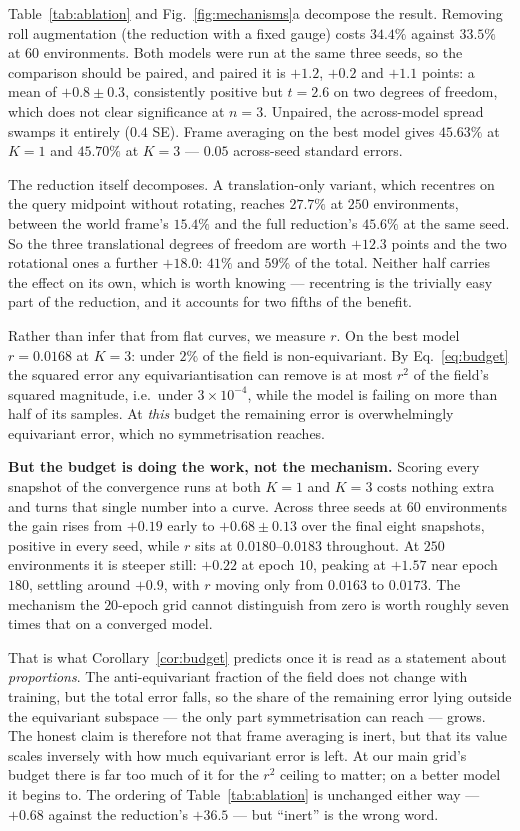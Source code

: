 \documentclass[10pt,twocolumn,letterpaper]{article}
\theoremstyle{plain}
\begin{document}
Table~\ref{tab:ablation} and Fig.~\ref{fig:mechanisms}a decompose the result.
Removing roll augmentation (the reduction with a fixed gauge) costs $34.4\%$
against $33.5\%$ at $60$ environments. Both models were run at the same three
seeds, so the comparison should be paired, and paired it is $+1.2$, $+0.2$ and
$+1.1$ points: a mean of $+0.8\pm0.3$, consistently positive but $t=2.6$ on two
degrees of freedom, which does not clear significance at $n{=}3$. Unpaired, the
across-model spread swamps it entirely ($0.4$ SE). Frame averaging on the best
model gives $45.63\%$ at $K{=}1$ and $45.70\%$ at $K{=}3$ --- $0.05$ across-seed
standard errors.

The reduction itself decomposes. A translation-only variant, which recentres on
the query midpoint without rotating, reaches $27.7\%$ at $250$ environments,
between the world frame's $15.4\%$ and the full reduction's $45.6\%$ at the same
seed. So the
three translational degrees of freedom are worth $+12.3$ points and the two
rotational ones a further $+18.0$: $41\%$ and $59\%$ of the total. Neither half
carries the effect on its own, which is worth knowing --- recentring is the
trivially easy part of the reduction, and it accounts for two fifths of the
benefit.

Rather than infer that from flat curves, we measure $r$. On the best model
$r=0.0168$ at $K{=}3$: under $2\%$ of the field is non-equivariant. By
Eq.~\eqref{eq:budget} the squared error any equivariantisation can remove is at
most $r^2$ of the field's squared magnitude, i.e.\ under $3\times10^{-4}$, while
the model is failing on more than half of its samples. At \emph{this} budget the
remaining error is overwhelmingly equivariant error, which no symmetrisation
reaches.

\textbf{But the budget is doing the work, not the mechanism.} Scoring every
snapshot of the convergence runs at both $K{=}1$ and $K{=}3$ costs nothing extra
and turns that single number into a curve. Across three seeds at $60$
environments the gain rises from $+0.19$ early to $+0.68\pm0.13$ over the final
eight snapshots, positive in every seed, while $r$ sits at $0.0180$--$0.0183$
throughout. At $250$ environments it is steeper still: $+0.22$ at epoch $10$,
peaking at $+1.57$ near epoch $180$, settling around $+0.9$, with $r$ moving only
from $0.0163$ to $0.0173$. The mechanism the $20$-epoch grid cannot distinguish
from zero is worth roughly seven times that on a converged model.

That is what Corollary~\ref{cor:budget} predicts once it is read as a statement
about \emph{proportions}. The anti-equivariant fraction of the field does not
change with training, but the total error falls, so the share of the remaining
error lying outside the equivariant subspace --- the only part symmetrisation can
reach --- grows. The honest claim is therefore not that frame averaging is inert,
but that its value scales inversely with how much equivariant error is left. At
our main grid's budget there is far too much of it for the $r^2$ ceiling to
matter; on a better model it begins to. The ordering of Table~\ref{tab:ablation}
is unchanged either way --- $+0.68$ against the reduction's $+36.5$ --- but
``inert'' is the wrong word.
\end{document}
